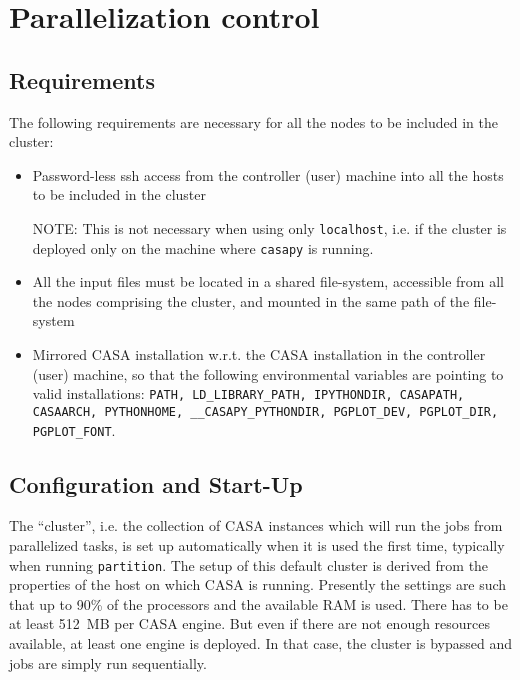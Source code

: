 \section{Parallelization control}

\subsection{Requirements}

The following requirements are necessary for all the nodes to be included in the cluster:

\begin{itemize}

\item Password-less ssh access from the controller (user) machine into all the
 hosts to be included in the cluster 

{NOTE:} This is not necessary when using only {\tt localhost}, i.e. if 
the cluster is deployed only on the machine where {\tt casapy} is running.

\item All the input files must be located in a shared file-system, accessible from all the 
nodes comprising the cluster, and mounted in the same path of the file-system

\item Mirrored CASA installation w.r.t. the CASA installation in the controller (user) machine, 
so that the following environmental variables are pointing to valid installations: {\tt PATH, 
LD\_LIBRARY\_PATH, IPYTHONDIR, CASAPATH, CASAARCH, PYTHONHOME, \_\_CASAPY\_PYTHONDIR, 
PGPLOT\_DEV, PGPLOT\_DIR, PGPLOT\_FONT}.

\end{itemize}

\subsection{Configuration and Start-Up}

The ``cluster'', i.e. the collection of CASA instances which will run the 
jobs from parallelized tasks, is set up automatically when it is used the first time,
typically when running {\tt partition}.
The setup of this default cluster is derived from the properties of the host
on which CASA is running. Presently the settings are such that up to 90\% of
the processors and the available RAM is used. There has to be at least 512~MB per CASA engine.
But even if there are not enough resources available, at least one engine is deployed.
In that case, the cluster is bypassed and jobs are simply run sequentially. 

